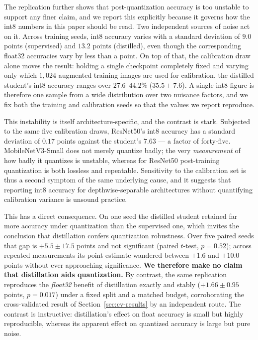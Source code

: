 \documentclass[conference]{IEEEtran}
\begin{document}
The replication further shows that post-quantization accuracy is too unstable to
support any finer claim, and we report this explicitly because it governs how the
int8 numbers in this paper should be read. Two independent sources of noise act
on it. Across training seeds, int8 accuracy varies with a standard deviation of
$9.0$ points (supervised) and $13.2$ points (distilled), even though the
corresponding float32 accuracies vary by less than a point. On top of that, the
calibration draw alone moves the result: holding a single checkpoint completely
fixed and varying only which $1{,}024$ augmented training images are used for
calibration, the distilled student's int8 accuracy ranges over $27.6$--$44.2\%$
($35.5\pm7.6$). A single int8 figure is therefore one sample from a wide
distribution over two nuisance factors, and we fix both the training and
calibration seeds so that the values we report reproduce.

This instability is itself architecture-specific, and the contrast is stark.
Subjected to the same five calibration draws, ResNet50's int8 accuracy has a
standard deviation of $0.17$ points against the student's $7.63$ --- a factor of
forty-five. MobileNetV3-Small does not merely quantize badly; the very
\emph{measurement} of how badly it quantizes is unstable, whereas for ResNet50
post-training quantization is both lossless and repeatable. Sensitivity to the
calibration set is thus a second symptom of the same underlying cause, and it
suggests that reporting int8 accuracy for depthwise-separable architectures
without quantifying calibration variance is unsound practice.

This has a direct consequence. On one seed the distilled student retained far
more accuracy under quantization than the supervised one, which invites the
conclusion that distillation confers quantization robustness. Over five paired
seeds that gap is $+5.5\pm17.5$ points and not significant (paired $t$-test,
$p=0.52$); across repeated measurements its point estimate wandered between
$+1.6$ and $+10.0$ points without ever approaching significance. \textbf{We therefore make no
claim that distillation aids quantization.} By contrast, the same replication
reproduces the \emph{float32} benefit of distillation exactly and stably
($+1.66\pm0.95$ points, $p=0.017$) under a fixed split and a matched budget,
corroborating the cross-validated result of Section~\ref{sec:cv-results} by an
independent route. The contrast is instructive: distillation's effect on float
accuracy is small but highly reproducible, whereas its apparent effect on
quantized accuracy is large but pure noise.
\end{document}
